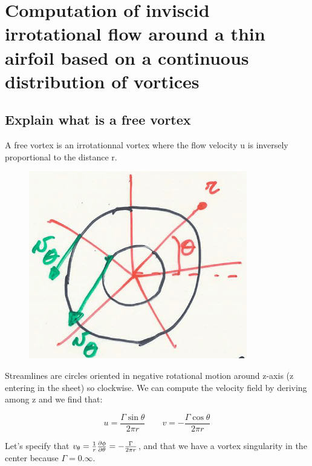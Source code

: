 \documentclass[british,french,11pt, a4paper, openany]{article}
\begin{document}

\section{Computation of inviscid irrotational flow around a thin airfoil based on a
	continuous distribution of vortices}
\subsection{Explain what is a free vortex}

A free vortex is an irrotationnal vortex where the flow velocity u is inversely proportional to the distance r.
\begin{figure}
	\vspace{-5mm}
	\includegraphics[scale=0.23]{ch2/26}
\end{figure}

Streamlines are circles oriented in negative rotational motion around z-axis (z entering in the sheet) so clockwise. We can compute the velocity field by deriving among z and we find that: 

\begin{equation}
u = \frac{\Gamma \sin \theta}{2 \pi r} \qquad v = -\frac{\Gamma \cos \theta}{2\pi r}
\end{equation}

Let's specify that $v_\theta = \frac{1}{r} \frac{\D \phi}{\D \theta} = -\frac{\Gamma}{2 \pi r}$, and that we have a vortex singularity in the center because $\Gamma = 0. \infty$.
\end{document}
